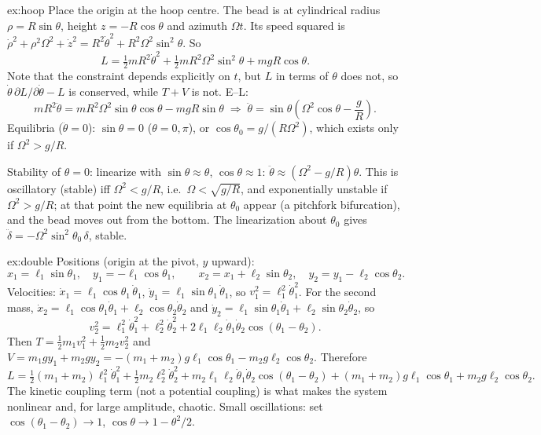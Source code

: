 \documentclass[11pt]{article}
\begin{document}
\begin{solution}{ex:hoop}
Place the origin at the hoop centre. The bead is at cylindrical radius $\rho=R\sin\theta$, height $z=-R\cos\theta$ and azimuth $\Omega t$. Its speed squared is $\dot\rho^2+\rho^2\Omega^2+\dot z^2=R^2\dot\theta^2+R^2\Omega^2\sin^2\theta$. So
\[
 L=\tfrac12mR^2\dot\theta^2+\tfrac12mR^2\Omega^2\sin^2\theta+mgR\cos\theta .
\]
Note that the constraint depends explicitly on $t$, but $L$ in terms of $\theta$ does not, so $\dot\theta\,\partial L/\partial\dot\theta-L$ is conserved, while $T+V$ is not. E--L:
\[
 mR^2\ddot\theta=mR^2\Omega^2\sin\theta\cos\theta-mgR\sin\theta
 \;\Rightarrow\;\ddot\theta=\sin\theta\left(\Omega^2\cos\theta-\frac gR\right).
\]
Equilibria ($\ddot\theta=0$): $\sin\theta=0$ ($\theta=0,\pi$), or $\cos\theta_0=g/(R\Omega^2)$, which exists only if $\Omega^2>g/R$.

Stability of $\theta=0$: linearize with $\sin\theta\approx\theta$, $\cos\theta\approx1$: $\ddot\theta\approx(\Omega^2-g/R)\theta$. This is oscillatory (stable) iff $\Omega^2<g/R$, i.e.\ $\Omega<\sqrt{g/R}$, and exponentially unstable if $\Omega^2>g/R$; at that point the new equilibria at $\theta_0$ appear (a pitchfork bifurcation), and the bead moves out from the bottom. The linearization about $\theta_0$ gives $\ddot\delta=-\Omega^2\sin^2\theta_0\,\delta$, stable.
\end{solution}

\begin{solution}{ex:double}
Positions (origin at the pivot, $y$ upward):
\[
 x_1=\ell_1\sin\theta_1,\quad y_1=-\ell_1\cos\theta_1,\qquad
 x_2=x_1+\ell_2\sin\theta_2,\quad y_2=y_1-\ell_2\cos\theta_2 .
\]
Velocities: $\dot x_1=\ell_1\cos\theta_1\,\dot\theta_1$, $\dot y_1=\ell_1\sin\theta_1\,\dot\theta_1$, so $v_1^2=\ell_1^2\dot\theta_1^2$. For the second mass,
$\dot x_2=\ell_1\cos\theta_1\dot\theta_1+\ell_2\cos\theta_2\dot\theta_2$ and $\dot y_2=\ell_1\sin\theta_1\dot\theta_1+\ell_2\sin\theta_2\dot\theta_2$, so
\[
 v_2^2=\ell_1^2\dot\theta_1^2+\ell_2^2\dot\theta_2^2+2\ell_1\ell_2\dot\theta_1\dot\theta_2\cos(\theta_1-\theta_2).
\]
Then $T=\tfrac12m_1v_1^2+\tfrac12m_2v_2^2$ and $V=m_1gy_1+m_2gy_2=-(m_1+m_2)g\ell_1\cos\theta_1-m_2g\ell_2\cos\theta_2$. Therefore
\[
 L=\tfrac12(m_1+m_2)\ell_1^2\dot\theta_1^2+\tfrac12m_2\ell_2^2\dot\theta_2^2+m_2\ell_1\ell_2\dot\theta_1\dot\theta_2\cos(\theta_1-\theta_2)+(m_1+m_2)g\ell_1\cos\theta_1+m_2g\ell_2\cos\theta_2 .
\]
The kinetic coupling term (not a potential coupling) is what makes the system nonlinear and, for large amplitude, chaotic. Small oscillations: set $\cos(\theta_1-\theta_2)\to1$, $\cos\theta\to1-\theta^2/2$.
\end{solution}
\end{document}
